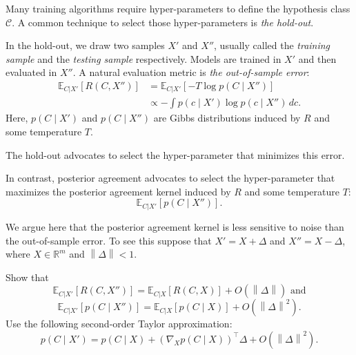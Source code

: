 Many training algorithms require hyper-parameters to define the hypothesis class $\mathcal{C}$. A common technique to select those hyper-parameters is \emph{the hold-out}. 

In the hold-out, we draw two samples $X'$ and $X''$, usually called the \emph{training sample} and the \emph{testing sample} respectively. Models are trained in $X'$ and then evaluated in $X''$. A natural evaluation metric is \emph{the out-of-sample error}:
%
\begin{align}
\mathbb{E}_{C | X'}\left[R(C, X'')\right] &= \mathbb{E}_{C | X'}\left[- T \log p(C \mid X'')\right]\\ 
&\propto - \int p(c \mid X') \log p(c \mid X'') \, dc.
\end{align}
%
Here, $p(C \mid X')$ and $p(C \mid X'')$ are Gibbs distributions induced by $R$ and some temperature $T$.

The hold-out advocates to select the hyper-parameter that minimizes this error.

In contrast, posterior agreement advocates to select the hyper-parameter that maximizes the posterior agreement kernel induced by $R$ and some temperature $T$:
%
\begin{equation}
\mathbb{E}_{C | X'}\left[p(C \mid X'')\right].
\end{equation}

We argue here that the posterior agreement kernel is less sensitive to noise than the out-of-sample error. To see this suppose that $X' = X + \Delta$ and $X'' = X - \Delta$, where $X \in \mathbb{R}^m$ and $\left\|\Delta\right\| < 1$. 

\begin{exercise} Show that
%
\begin{equation}
\mathbb{E}_{C | X'}[R(C, X'')] = \mathbb{E}_{C | X}[R(C, X)] + O(\left\|\Delta\right\|) \text{ and}
\end{equation}
%
\begin{equation}
\mathbb{E}_{C | X'}[p(C \mid X'')] = \mathbb{E}_{C | X}[p(C \mid X)] + O(\left\|\Delta\right\|^2).
\end{equation}
%
Use the following second-order Taylor approximation:
%
\begin{equation}
p(C \mid X') = p(C \mid X) + \left(\nabla_{X}p(C\mid X)\right)^\top \Delta + O(\left\|\Delta\right\|^2).
\end{equation}
%
\end{exercise}
%

